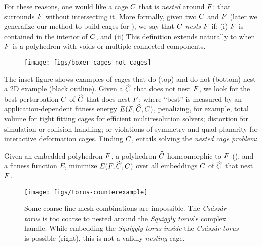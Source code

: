 For these reasons, one would like a cage $C$ that is \emph{nested} around
$F$: that surrounds $F$ without intersecting it. More formally, given
two 
%
$C$ and $F$ (later we generalize our method to build cages for ), we say that $C$ \emph{nests} $F$ if: 
%
(i) $F$ is contained in the interior of $C$, and 
%
(ii) 
This definition extends naturally to when $F$ is a polyhedron with voids or multiple connected components.

\begin{wrapfigure}[15]{r}{1.02in}
%
\centering
%
\vspace{-0.5cm}
\texttt{[image: figs/boxer-cages-not-cages]}
%
\end{wrapfigure}
%
The inset figure shows examples of cages that do (top) and do not (bottom) nest
a 2D example (black outline). Given a $\widehat{C}$ that does not nest $F$, we
look for the best perturbation $C$ of $\widehat{C}$ that does nest $F$; where
``best'' is measured by an application-dependent fitness energy $E(F,
\widehat{C}, C)$, penalizing, for example, total volume for tight fitting cages
for efficient multiresolution solvers; distortion for simulation or collision
handling; or violations of symmetry and quad-planarity for interactive
deformation cages.  Finding $C$,  entails solving the \emph{nested cage
problem}:

Given an embedded polyhedron $F$, a polyhedron $\widehat{C}$ homeomorphic to $F$ (), and a
fitness function $E$, minimize $E(F, \widehat{C}, C)$ over all embeddings
$C$ of $\widehat{C}$ that nest $F$.


\begin{figure}
  \texttt{[image: figs/torus-counterexample]}
  \caption{Some coarse-fine mesh combinations are impossible. The
  \emph{Cs\'asz\'ar torus} is too coarse to nested around the
  \emph{Squiggly torus}'s complex handle. While embedding the \emph{Squiggly
  torus} \emph{inside} the \emph{Cs\'asz\'ar torus} is possible (right), this
  is not a validly \emph{nesting} cage.}
  \label{fig:torus-counterexample}
\end{figure}

